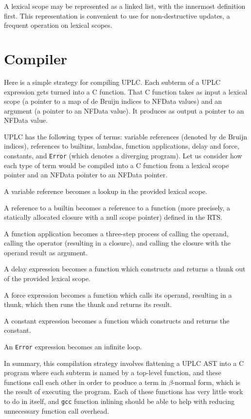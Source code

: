 \documentclass[12pt]{article}
\begin{document}
A lexical scope may be represented as a linked list, with the innermost definition first. This representation is convenient to use for non-destructive updates, a frequent operation on lexical scopes.

\section{Compiler}

Here is a simple strategy for compiling UPLC. Each subterm of a UPLC expression gets turned into a C function. That C function takes as input a lexical scope (a pointer to a map of de Bruijn indices to NFData values) and an argument (a pointer to an NFData value). It produces as output a pointer to an NFData value.

UPLC has the following types of terms: variable references (denoted by de Bruijn indices), references to builtins, lambdas, function applications, delay and force, constants, and \texttt{Error} (which denotes a diverging program). Let us consider how each type of term would be compiled into a C function from a lexical scope pointer and an NFData pointer to an NFData pointer.

A variable reference becomes a lookup in the provided lexical scope.

A reference to a builtin becomes a reference to a function (more precisely, a statically allocated closure with a null scope pointer) defined in the RTS.

A function application becomes a three-step process of calling the operand, calling the operator (resulting in a closure), and calling the closure with the operand result as argument.

A delay expression becomes a function which constructs and returns a thunk out of the provided lexical scope.

A force expression becomes a function which calls its operand, resulting in a thunk, which then runs the thunk and returns its result.

A constant expression becomes a function which constructs and returns the constant.

An \texttt{Error} expression becomes an infinite loop.

In summary, this compilation strategy involves flattening a UPLC AST into a C program where each subterm is named by a top-level function, and these functions call each other in order to produce a term in $\beta$-normal form, which is the result of executing the program. Each of these functions has very little work to do in itself, and \texttt{gcc} function inlining should be able to help with reducing unnecessary function call overhead.
\end{document}
